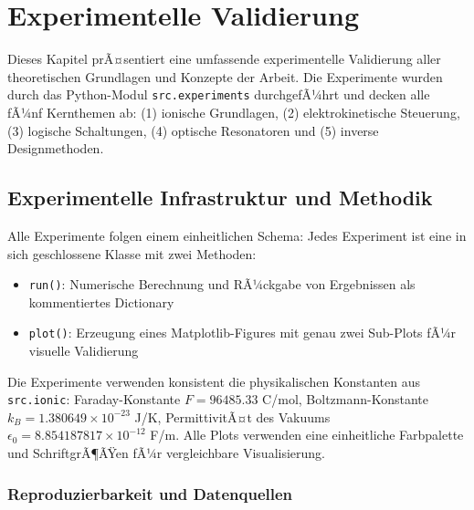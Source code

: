 ﻿\documentclass[a4paper,12pt]{scrreprt}
\theoremstyle{definition}
\begin{document}

\section{Experimentelle Validierung}

Dieses Kapitel prÃ¤sentiert eine umfassende experimentelle Validierung aller theoretischen Grundlagen und Konzepte der Arbeit. Die Experimente wurden durch das Python-Modul \texttt{src.experiments} durchgefÃ¼hrt und decken alle fÃ¼nf Kernthemen ab: (1) ionische Grundlagen, (2) elektrokinetische Steuerung, (3) logische Schaltungen, (4) optische Resonatoren und (5) inverse Designmethoden.

\subsection{Experimentelle Infrastruktur und Methodik}

Alle Experimente folgen einem einheitlichen Schema: Jedes Experiment ist eine in sich geschlossene Klasse mit zwei Methoden:
\begin{itemize}
	\item \texttt{run()}: Numerische Berechnung und RÃ¼ckgabe von Ergebnissen als kommentiertes Dictionary
	\item \texttt{plot()}: Erzeugung eines Matplotlib-Figures mit genau zwei Sub-Plots fÃ¼r visuelle Validierung
\end{itemize}

Die Experimente verwenden konsistent die physikalischen Konstanten aus \texttt{src.ionic}: Faraday-Konstante $F = 96485.33$ C/mol, Boltzmann-Konstante $k_B = 1.380649 \times 10^{-23}$ J/K, PermittivitÃ¤t des Vakuums $\epsilon_0 = 8.854187817 \times 10^{-12}$ F/m. Alle Plots verwenden eine einheitliche Farbpalette und SchriftgrÃ¶ÃŸen fÃ¼r vergleichbare Visualisierung.

\subsubsection{Reproduzierbarkeit und Datenquellen}
\end{document}
